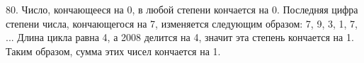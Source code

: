 80. Число, кончающееся на 0, в любой степени кончается на 0. Последняя цифра степени числа, кончающегося на 7, изменяется следующим образом: 7, 9, 3, 1, 7, ...
Длина цикла равна 4, а 2008 делится на 4, значит эта степень кончается на 1. Таким образом, сумма этих чисел кончается на 1.\\
